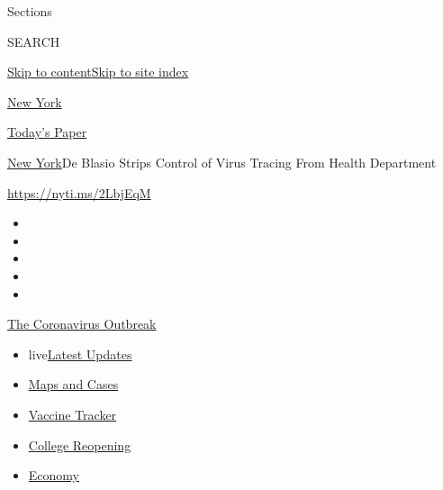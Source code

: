 Sections

SEARCH

\protect\hyperlink{site-content}{Skip to
content}\protect\hyperlink{site-index}{Skip to site index}

\href{https://www.nytimes.com/section/nyregion}{New York}

\href{https://myaccount.nytimes.com/auth/login?response_type=cookie\&client_id=vi}{}

\href{https://www.nytimes.com/section/todayspaper}{Today's Paper}

\href{/section/nyregion}{New York}\textbar{}De Blasio Strips Control of
Virus Tracing From Health Department

\url{https://nyti.ms/2LbjEqM}

\begin{itemize}
\item
\item
\item
\item
\item
\end{itemize}

\href{https://www.nytimes.com/news-event/coronavirus?action=click\&pgtype=Article\&state=default\&region=TOP_BANNER\&context=storylines_menu}{The
Coronavirus Outbreak}

\begin{itemize}
\tightlist
\item
  live\href{https://www.nytimes.com/2020/08/04/world/coronavirus-covid-19.html?action=click\&pgtype=Article\&state=default\&region=TOP_BANNER\&context=storylines_menu}{Latest
  Updates}
\item
  \href{https://www.nytimes.com/interactive/2020/us/coronavirus-us-cases.html?action=click\&pgtype=Article\&state=default\&region=TOP_BANNER\&context=storylines_menu}{Maps
  and Cases}
\item
  \href{https://www.nytimes.com/interactive/2020/science/coronavirus-vaccine-tracker.html?action=click\&pgtype=Article\&state=default\&region=TOP_BANNER\&context=storylines_menu}{Vaccine
  Tracker}
\item
  \href{https://www.nytimes.com/2020/08/02/us/covid-college-reopening.html?action=click\&pgtype=Article\&state=default\&region=TOP_BANNER\&context=storylines_menu}{College
  Reopening}
\item
  \href{https://www.nytimes.com/live/2020/08/04/business/stock-market-today-coronavirus?action=click\&pgtype=Article\&state=default\&region=TOP_BANNER\&context=storylines_menu}{Economy}
\end{itemize}

